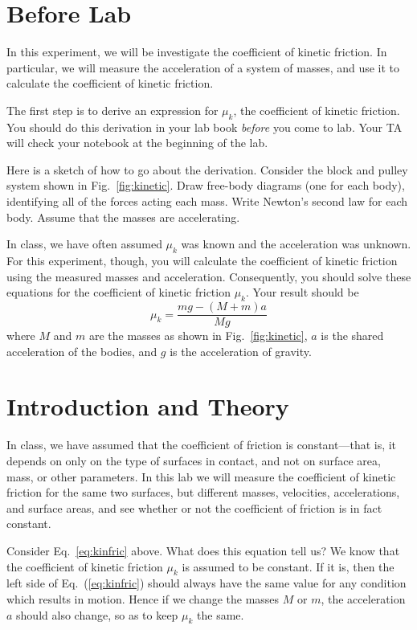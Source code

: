 \newexp \label{exp:kinetic}
  

\section*{Before Lab} In this experiment, we will be investigate the
coefficient of kinetic friction.  In particular, we will measure
the acceleration of a system of masses, and use it to calculate the
coefficient of kinetic friction.

The first step is to derive an expression for $\mu_k$, the
coefficient
of kinetic friction.  You should do this derivation in your lab book
{\em before} you come to lab.  Your TA will check your notebook at
the beginning of the lab.

Here is a sketch of how to go about the derivation.  Consider the block
and pulley system shown in Fig.~\ref{fig:kinetic}.  Draw 
free-body
diagrams (one for each body), identifying all of the forces acting each mass.  Write
Newton's second law for each body.   Assume that the masses are
accelerating.

In class, we have often assumed $\mu_k$ was known and the acceleration
was unknown.
For this experiment, though, you will calculate the
coefficient of kinetic friction using the measured masses and
acceleration.  Consequently, you should solve these equations for the
coefficient of kinetic friction $\mu_k$.  Your
result should be
\setcounter{equation}{0}
\begin{equation}
	\mu_{k} = \frac{mg - (M+m)a}{Mg} \label{eq:kinfric}
\end{equation}
where $M$ and $m$ are the masses as shown in Fig.~\ref{fig:kinetic},
$a$ is the shared acceleration of the bodies, and $g$ is the acceleration
of gravity.

\section*{Introduction and Theory}
In class, we have assumed that the
coefficient of friction is constant---that is, it depends on only on the type of surfaces
in contact, and not on surface area, mass, or other parameters.  In
this lab we will measure the
coefficient of kinetic friction for the same two surfaces, but different
masses, velocities, accelerations, and surface areas, and see whether
or not the coefficient of friction is in fact constant.

Consider Eq.~\ref{eq:kinfric} above.  What does this equation tell us?
We know that the
coefficient of kinetic friction $\mu_{k}$ is assumed to be constant.
If it is, then the left side of Eq.~(\ref{eq:kinfric})
should always have the same value for any condition which results
in motion. 
Hence if we change the masses $M$ or $m$, the acceleration
$a$ should also change, so as to keep $\mu_k$
 the same.

